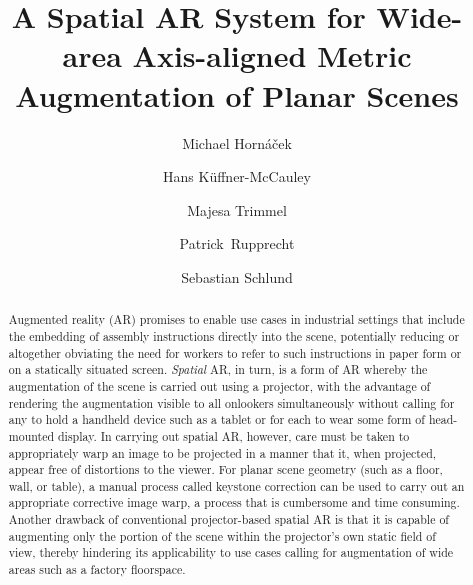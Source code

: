 \documentclass[review]{elsarticle}
\begin{document}
\begin{frontmatter}

\title{A Spatial AR System for Wide-area Axis-aligned Metric Augmentation of Planar Scenes} %

\author{Michael Horn\'{a}\v{c}ek}
\author{Hans K\"{u}ffner-McCauley}
\author{Majesa Trimmel}
\author{Patrick~Rupprecht}
\author{Sebastian Schlund}
\address{Human Centered Cyber Physical Production and Assembly Systems, Institute for Management Sciences, TU Wien, Vienna, Austria}

\begin{abstract}
Augmented reality (AR) promises to enable use cases in industrial settings that include the embedding of assembly instructions directly into the scene, potentially reducing or altogether obviating the need for workers to refer to such instructions in paper form or on a statically situated screen. \textit{Spatial} AR, in turn, is a form of AR whereby the augmentation of the scene is carried out using a projector, with the advantage of rendering the augmentation visible to all onlookers simultaneously without calling for any to hold a handheld device such as a tablet or for each to wear some form of head-mounted display. In carrying out spatial AR, however, care must be taken to appropriately warp an image to be projected in a manner that it, when projected, appear free of distortions to the viewer. For planar scene geometry (such as a floor, wall, or table), a manual process called keystone correction can be used to carry out an appropriate corrective image warp, a process that is cumbersome and time consuming. Another drawback of conventional projector-based spatial AR is that it is capable of augmenting only the portion of the scene within the projector's own static field of view, thereby hindering its applicability to use cases calling for augmentation of wide areas such as a factory floorspace.


\end{abstract}
\end{frontmatter}
\end{document}
